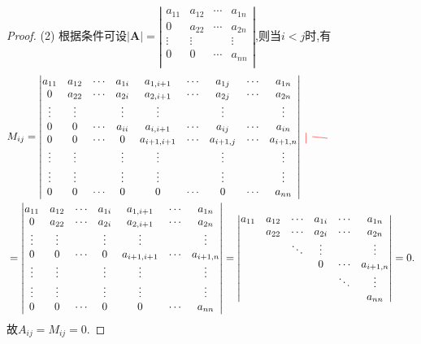 \documentclass[../../main.tex]{subfiles}
\begin{document}
\begin{proof}
(2) 根据条件可设$\left| \boldsymbol{A} \right|=\left| \begin{matrix}
a_{11}&		a_{12}&		\cdots&		a_{1n}\\
0&		a_{22}&		\cdots&		a_{2n}\\
\vdots&		\vdots&		&		\vdots\\
0&		0&		\cdots&		a_{nn}\\
\end{matrix} \right|$,则当$i<j$时,有
\begin{align*}
& M_{ij}=\left| \begin{matrix}
a_{11}&		a_{12}&		\cdots&		a_{1i}&		a_{1,i+1}&		\cdots&		\MyTikzmark{topA}{a_{1j}}&		\cdots&		a_{1n}\\
0&		a_{22}&		\cdots&		a_{2i}&		a_{2,i+1}&		\cdots&		a_{2j}&		\cdots&		a_{2n}\\
\vdots&		\vdots&		&		\vdots&		\vdots&		&		\vdots&		&		\vdots\\
\MyTikzmark{leftA}{0}&		0&		\cdots&		a_{ii}&		a_{i,i+1}&		\cdots&		a_{ij}&		\cdots&		\MyTikzmark{rightA}{a_{in}}\\
0&		0&		\cdots&		0&		a_{i+1,i+1}&		\cdots&		a_{i+1,j}&		\cdots&		a_{i+1,n}\\
\vdots&		\vdots&		&		\vdots&		\vdots&		&		\vdots&		&		\vdots\\
\vdots&		\vdots&		&		\vdots&		\vdots&		&		\vdots&		&		\vdots\\
0&		0&		\cdots&		0&		0&		\cdots&		\MyTikzmark{bottomA}{0}&		\cdots&		a_{nn}\\
\end{matrix} \right|
\text{\DrawVLine[red, thick, opacity=0.5]{topA}{bottomA}
\DrawHLine[red, thick, opacity=0.5]{leftA}{rightA}}
\\
&=\left| \begin{matrix}
a_{11}&		a_{12}&		\cdots&		a_{1i}&		a_{1,i+1}&		\cdots&		a_{1n}\\
0&		a_{22}&		\cdots&		a_{2i}&		a_{2,i+1}&		\cdots&		a_{2n}\\
\vdots&		\vdots&		&		\vdots&		\vdots&		&		\vdots\\
0&		0&		\cdots&		0&		a_{i+1,i+1}&		\cdots&		a_{i+1,n}\\
\vdots&		\vdots&		&		\vdots&		\vdots&		&		\vdots\\
\vdots&		\vdots&		&		\vdots&		\vdots&		&		\vdots\\
0&		0&		\cdots&		0&		0&		\cdots&		a_{nn}\\
\end{matrix} \right|=\left| \begin{matrix}
a_{11}&		a_{12}&		\cdots&		a_{1i}&		\cdots&		a_{1n}\\
&		a_{22}&		\cdots&		a_{2i}&		\cdots&		a_{2n}\\
&		&		\ddots&		\vdots&		&		\vdots\\
&		&		&		0&		\cdots&		a_{i+1,n}\\
&		&		&		&		\ddots&		\vdots\\
&		&		&		&		&		a_{nn}\\
\end{matrix} \right|=0.
\end{align*}
故\(A_{ij}=M_{ij}=0\).


\end{proof}
\end{document}
